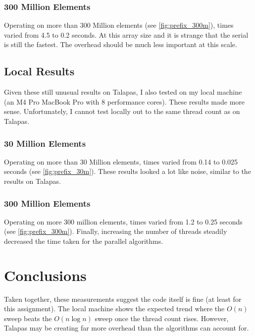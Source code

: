 \documentclass[11pt]{article}
\begin{document}
\subsubsection{300 Million Elements}
Operating on more than 300 Million elements (see \ref{fig:prefix_300m}), times varied from 4.5 to 0.2 seconds. At this array size and it is strange that the serial is still the fastest. The overhead should be much less important at this scale.
\subsection{Local Results}
Given these still unusual results on Talapas, I also tested on my local machine (an M4 Pro MacBook Pro with 8 performance cores). These results made more sense. Unfortunately, I cannot test locally out to the same thread count as on Talapas.
\subsubsection{30 Million Elements}
Operating on more than 30 Million elements, times varied from 0.14 to 0.025 seconds (see \ref{fig:prefix_30m}). These results looked a lot like noise, similar to the results on Talapas.
\subsubsection{300 Million Elements}
Operating on more 300 million elements, times varied from 1.2 to 0.25 seconds (see \ref{fig:prefix_300m}). Finally, increasing the number of threads steadily decreased the time taken for the parallel algorithms. 
\section{Conclusions}
Taken together, these measurements suggest the code itself is fine (at least for this assignment). The local machine shows the expected trend where the $O(n)$ sweep beats the $O(n\log n)$ sweep once the thread count rises. However, Talapas may be creating far more overhead than the algorithms can account for.
\end{document}
